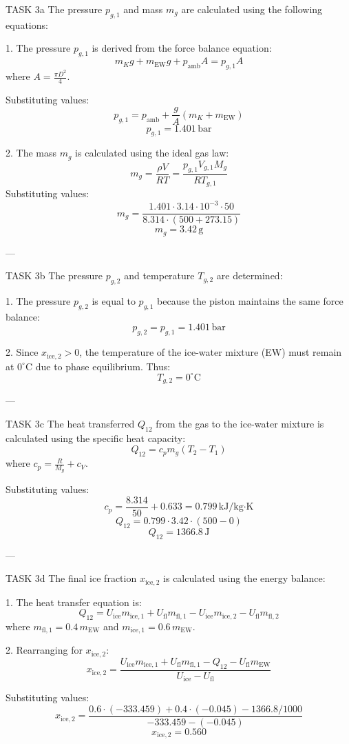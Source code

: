 TASK 3a  
The pressure \( p_{g,1} \) and mass \( m_g \) are calculated using the following equations:  

1. The pressure \( p_{g,1} \) is derived from the force balance equation:  
\[
m_K g + m_{\text{EW}} g + p_{\text{amb}} A = p_{g,1} A
\]  
where \( A = \frac{\pi D^2}{4} \).  

Substituting values:  
\[
p_{g,1} = p_{\text{amb}} + \frac{g}{A} (m_K + m_{\text{EW}})
\]  
\[
p_{g,1} = 1.401 \, \text{bar}
\]  

2. The mass \( m_g \) is calculated using the ideal gas law:  
\[
m_g = \frac{\rho V}{R T} = \frac{p_{g,1} V_{g,1} M_g}{R T_{g,1}}
\]  
Substituting values:  
\[
m_g = \frac{1.401 \cdot 3.14 \cdot 10^{-3} \cdot 50}{8.314 \cdot (500 + 273.15)}
\]  
\[
m_g = 3.42 \, \text{g}
\]  

---

TASK 3b  
The pressure \( p_{g,2} \) and temperature \( T_{g,2} \) are determined:  

1. The pressure \( p_{g,2} \) is equal to \( p_{g,1} \) because the piston maintains the same force balance:  
\[
p_{g,2} = p_{g,1} = 1.401 \, \text{bar}
\]  

2. Since \( x_{\text{ice},2} > 0 \), the temperature of the ice-water mixture (EW) must remain at \( 0^\circ\text{C} \) due to phase equilibrium. Thus:  
\[
T_{g,2} = 0^\circ\text{C}
\]  

---

TASK 3c  
The heat transferred \( Q_{12} \) from the gas to the ice-water mixture is calculated using the specific heat capacity:  
\[
Q_{12} = c_p m_g (T_{2} - T_{1})
\]  
where \( c_p = \frac{R}{M_g} + c_V \).  

Substituting values:  
\[
c_p = \frac{8.314}{50} + 0.633 = 0.799 \, \text{kJ/kg·K}
\]  
\[
Q_{12} = 0.799 \cdot 3.42 \cdot (500 - 0)
\]  
\[
Q_{12} = 1366.8 \, \text{J}
\]  

---

TASK 3d  
The final ice fraction \( x_{\text{ice},2} \) is calculated using the energy balance:  

1. The heat transfer equation is:  
\[
Q_{12} = U_{\text{ice}} m_{\text{ice},1} + U_{\text{fl}} m_{\text{fl},1} - U_{\text{ice}} m_{\text{ice},2} - U_{\text{fl}} m_{\text{fl},2}
\]  
where \( m_{\text{fl},1} = 0.4 \, m_{\text{EW}} \) and \( m_{\text{ice},1} = 0.6 \, m_{\text{EW}} \).  

2. Rearranging for \( x_{\text{ice},2} \):  
\[
x_{\text{ice},2} = \frac{U_{\text{ice}} m_{\text{ice},1} + U_{\text{fl}} m_{\text{fl},1} - Q_{12} - U_{\text{fl}} m_{\text{EW}}}{U_{\text{ice}} - U_{\text{fl}}}
\]  

Substituting values:  
\[
x_{\text{ice},2} = \frac{0.6 \cdot (-333.459) + 0.4 \cdot (-0.045) - 1366.8 / 1000}{-333.459 - (-0.045)}
\]  
\[
x_{\text{ice},2} = 0.560
\]  


